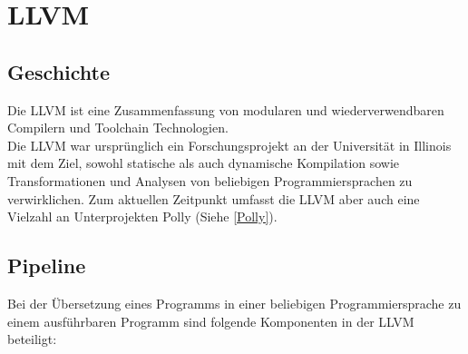 \chapter{LLVM}
\section{Geschichte \cite{LLVMWebsite}\cite{LLVMResearchBeginning}}
Die \ac{LLVM} ist eine Zusammenfassung von modularen und wiederverwendbaren Compilern und Toolchain Technologien.\\
Die \ac{LLVM} war ursprünglich ein Forschungsprojekt an der Universität in Illinois mit dem Ziel, sowohl statische als auch dynamische Kompilation sowie Transformationen und Analysen von beliebigen Programmiersprachen zu verwirklichen. Zum aktuellen Zeitpunkt umfasst die \ac{LLVM} aber auch eine Vielzahl an Unterprojekten \ua Polly (Siehe \ref{Polly}).

\section{Pipeline\cite{IntroLLVM}}
Bei der Übersetzung eines Programms in einer beliebigen Programmiersprache zu einem ausführbaren Programm sind folgende Komponenten in der LLVM beteiligt:
\begin{center}
\end{center}
